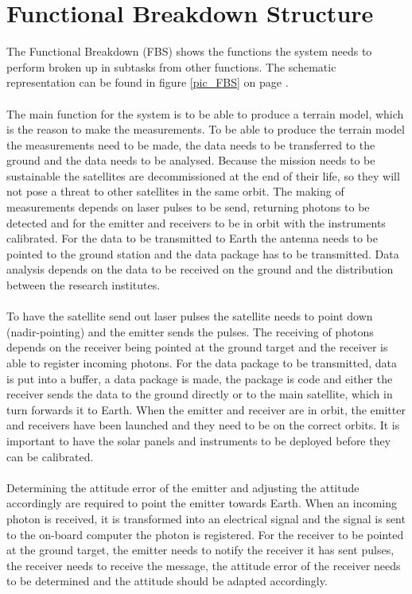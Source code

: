 \section{Functional Breakdown Structure}
The Functional Breakdown (FBS) shows the functions the system needs to perform broken up in subtasks from other functions. The schematic representation can be found in figure \ref{pic_FBS} on page \pageref{pic_FBS}.
\\ \\
The main function for the system is to be able to produce a terrain model, which is the reason to make the measurements. To be able to produce the terrain model the measurements need to be made, the data needs to be transferred to the ground and the data needs to be analysed. Because the mission needs to be sustainable the satellites are decommissioned at the end of their life, so they will not pose a threat to other satellites in the same orbit.
The making of measurements depends on laser pulses to be send, returning photons to be detected and for the emitter and receivers to be in orbit with the instruments calibrated. For the data to be transmitted to Earth the antenna needs to be pointed to the ground station and the data package has to be transmitted. Data analysis depends on the data to be received on the ground and the distribution between the research institutes.
\\ \\
To have the satellite send out laser pulses the satellite needs to point down (nadir-pointing) and the emitter sends the pulses. The receiving of photons depends on the receiver being pointed at the ground target and the receiver is able to register incoming photons. For the data package to be transmitted, data is put into a buffer, a data package is made, the package is code and either the receiver sends the data to the ground directly or to the main satellite, which in turn forwards it to Earth. When the emitter and receiver are in orbit, the emitter and receivers have been launched and they need to be on the correct orbits. It is important to have the solar panels and instruments to be deployed before they can be calibrated.
\\ \\
Determining the attitude error of the emitter and adjusting the attitude accordingly are required to point the emitter towards Earth. When an incoming photon is received, it is transformed into an electrical signal and the signal is sent to the on-board computer the photon is registered. For the receiver to be pointed at the ground target, the emitter needs to notify the receiver it has sent pulses, the receiver needs to receive the message, the attitude error of the receiver needs to be determined and the attitude should be adapted accordingly. 

